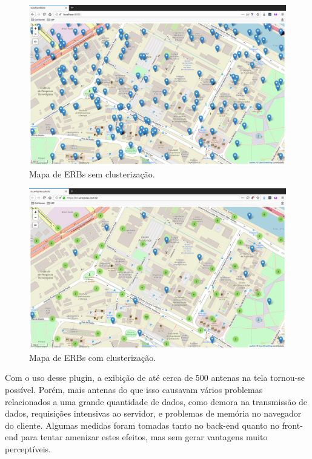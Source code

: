 \documentclass[]{politex}
\begin{document}
  \begin{figure}[H]
    \centering
    \includegraphics[width=6in]{imagens/mapa_sem_clusters}
    \caption{Mapa de ERBs sem clusterização.}
    \label{fig:mapa_sem_clusters}
  \end{figure}

  \begin{figure}[H]
    \centering
    \includegraphics[width=6in]{imagens/mapa_com_clusters}
    \caption{Mapa de ERBs com clusterização.}
    \label{fig:mapa_com_clusters}
  \end{figure}

Com o uso desse plugin, a exibição de até cerca de 500 antenas na tela tornou-se
possível. Porém, mais antenas do que isso causavam vários problemas relacionados
a uma grande quantidade de dados, como demora na transmissão de dados,
requisições intensivas ao servidor, e problemas de memória no navegador do
cliente. Algumas medidas foram tomadas tanto no back-end quanto no front-end
para tentar amenizar estes efeitos, mas sem gerar vantagens muito perceptíveis.
\end{document}
